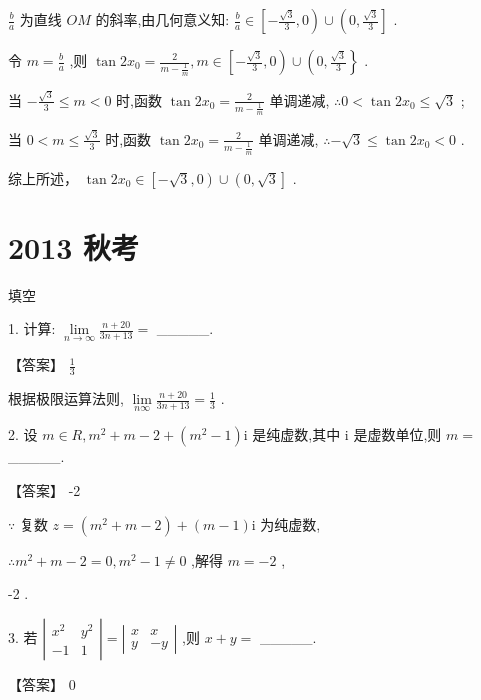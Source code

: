 \documentclass[10pt]{article}
\begin{document}
\(\frac{b}{a}\) 为直线 \({OM}\) 的斜率,由几何意义知: \(\frac{b}{a} \in  \left\lbrack  {-\frac{\sqrt{3}}{3},0}\right)  \cup  \left( {0,\frac{\sqrt{3}}{3}}\right\rbrack\) .

令 \(m = \frac{b}{a}\) ,则 \(\tan 2{x}_{0} = \frac{2}{m - \frac{1}{m}},m \in  \left\lbrack  {-\frac{\sqrt{3}}{3},0}\right)  \cup  \left( {0,\frac{\sqrt{3}}{3}}\right\}\) .

当 \(- \frac{\sqrt{3}}{3} \leq  m < 0\) 时,函数 \(\tan 2{x}_{0} = \frac{2}{m - \frac{1}{m}}\) 单调递减, \(\therefore 0 < \tan 2{x}_{0} \leq  \sqrt{3}\) ;

当 \(0 < m \leq  \frac{\sqrt{3}}{3}\) 时,函数 \(\tan 2{x}_{0} = \frac{2}{m - \frac{1}{m}}\) 单调递减, \(\therefore  - \sqrt{3} \leq  \tan 2{x}_{0} < 0\) .

综上所述， \(\tan 2{x}_{0} \in  \left\lbrack  {-\sqrt{3},0}\right)  \cup  \left( {0,\sqrt{3}}\right\rbrack\) .

\section*{2013 秋考}

填空

1. 计算: \(\mathop{\lim }\limits_{{n \rightarrow  \infty }}\frac{n + {20}}{{3n} + {13}} =\) \_\_\_\_\_.

【答案】 \(\frac{1}{3}\)

根据极限运算法则, \(\mathop{\lim }\limits_{{n\infty }}\frac{n + {20}}{{3n} + {13}} = \frac{1}{3}\) .

2. 设 \(m \in  R,{m}^{2} + m - 2 + \left( {{m}^{2} - 1}\right) \mathrm{i}\) 是纯虚数,其中 \(\mathrm{i}\) 是虚数单位,则 \(m =\) \_\_\_\_\_.

【答案】 -2

\(\because\) 复数 \(z = \left( {{m}^{2} + m - 2}\right)  + \left( {m - 1}\right) \mathrm{i}\) 为纯虚数,

\(\therefore {m}^{2} + m - 2 = 0,{m}^{2} - 1 \neq  0\) ,解得 \(m =  - 2\) ,

-2 .

3. 若 \(\left| \begin{matrix} {x}^{2} & {y}^{2} \\   - 1 & 1 \end{matrix}\right|  = \left| \begin{matrix} x & x \\  y &  - y \end{matrix}\right|\) ,则 \(x + y =\) \_\_\_\_\_.

【答案】 0
\end{document}
